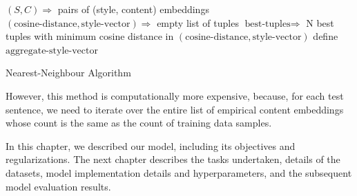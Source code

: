\begin{algorithm}[H]
	$(S, C) \Rightarrow$ pairs of (style, content) embeddings\;
	$(\text{cosine-distance}, \text{style-vector}) \Rightarrow$ empty list of tuples\;
	$\text{best-tuples} \Rightarrow$ N best tuples with minimum cosine distance in $(\text{cosine-distance}, \text{style-vector})$\;
	define $\text{aggregate-style-vector}$\;
	\;

	\caption{\label{alg:nearest-neighbour} Nearest-Neighbour Algorithm}
\end{algorithm}

However, this method is computationally more expensive, because, for each test sentence, we need to iterate over the entire list of empirical content embeddings whose count is the same as the count of training data samples.


In this chapter, we described our model, including its objectives and regularizations. The next chapter describes the tasks undertaken, details of the datasets, model implementation details and hyperparameters, and the subsequent model evaluation results.
